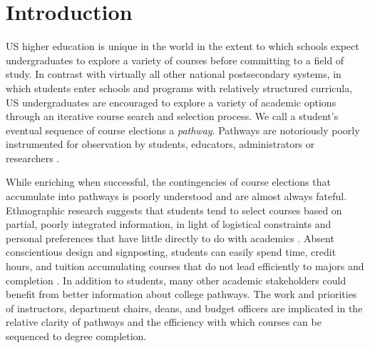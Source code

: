 \section{Introduction}



US higher education is unique in the world in the extent to
which schools expect undergraduates to explore a variety of courses before committing to a field of study. In contrast with virtually all other national postsecondary systems, in which students enter schools and programs with relatively structured curricula, US undergraduates are encouraged to explore a variety of academic options through an iterative course search and selection process. We call a student's
eventual sequence of course elections a {\it pathway}. Pathways are notoriously poorly instrumented for observation by students, educators, administrators or researchers \cite{chambliss2014college}.

While enriching when successful, the contingencies of course elections that accumulate into pathways is poorly understood and are almost always fateful. Ethnographic research suggests that students tend to select courses based on partial, poorly integrated information, in light of logistical constraints and personal preferences that have little directly to do with academics \cite{nathan2006my,rosenbaum2011complexities, rosenbaum2007after}. Absent conscientious design and signposting, students can easily spend time, credit hours, and tuition accumulating courses that do not lead efficiently to majors and completion \cite{bailey2015redesigning}. In addition to students, many other academic stakeholders could benefit from better information about college pathways. The work and priorities of instructors, department chairs, deans, and budget officers are implicated in the relative clarity of pathways and the efficiency with which courses can be sequenced to degree completion. 



